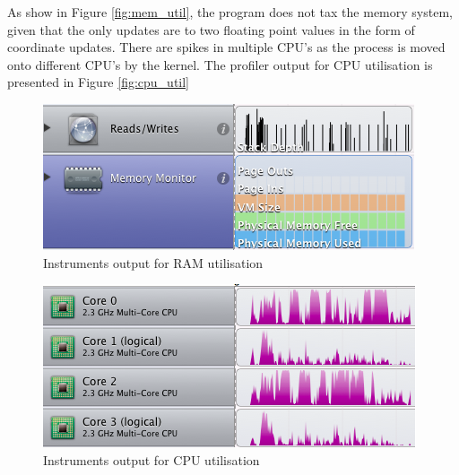 \documentclass[a4paper,11pt, twocolumn]{article}
\newenvironment{changemargin}[2]{\begin{list}{}{%
\setlength{\topsep}{0pt}%
\setlength{\leftmargin}{0pt}%
\setlength{\rightmargin}{0pt}%
\setlength{\listparindent}{\parindent}%
\setlength{\itemindent}{\parindent}%
\setlength{\parsep}{0pt plus 1pt}%
\addtolength{\leftmargin}{#1}%
\addtolength{\rightmargin}{#2}%
}\item }{\end{list}}
\begin{document}
As show in Figure \ref{fig:mem_util}, the program does not tax the memory system, given that the only updates are to two floating point values in the form of coordinate updates.
There are spikes in multiple CPU's as the process is moved onto different CPU's by the kernel. The profiler output for CPU utilisation is presented in Figure \ref{fig:cpu_util}
\begin{figure}[!h]
\begin{changemargin}{-20mm}{-20mm}
\center
\includegraphics[scale=0.4]{mem_util.png}
\caption{Instruments output for RAM utilisation}
\end{changemargin}
\end{figure}

\begin{figure}[!h]
\begin{changemargin}{-20mm}{-20mm}
\center
\includegraphics[scale=0.4]{cpu_util.png}
\caption{Instruments output for CPU utilisation}
\end{changemargin}
\end{figure}
\end{document}
